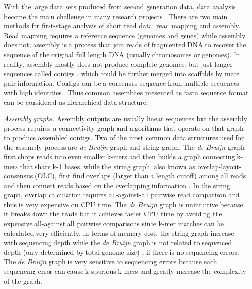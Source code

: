 \documentclass[]{msu-thesis}
\begin{document}
With the large data sets produced from second generation data, data analysis
become the main challenge in many research projects
\cite{qin_human_2010,pell_scaling_2012}. There are two main methods
for first-stage analysis of short read data: read mapping and assembly. Read mapping requires a
reference sequence (genomes and genes) while assembly does not; assembly
is a process that join reads of fragmented DNA to recover the sequence
of the original full length DNA (usually chromosomes or genomes). In
reality, assembly mostly does not produce complete genomes, but just
longer sequences called contigs
\cite{qin_human_2010,howe_tackling_2014}, which could be further
merged into scaffolds by mate pair information. Contigs can be a
consensus sequence from multiple sequences with high identities
\cite{zerbino_velvet:_2008}. Thus common assemblies presented as fasta
sequence format can be considered as hierarchical data structure.

\textit{Assembly graphs. } Assembly outputs are usually linear
sequences but the assembly process requires a connectivity graph and
algorithms that operate on that graph to produce assembled contigs. Two of the most common data structures used for the assembly
process are \textit{de Bruijn} graph and string graph.  The \textit{de
  Bruijn} graph first chops reads into even smaller k-mers and then
builds a graph connecting k-mers that share k-1 bases, while the string
graph, also known as overlap-layout-consensus (OLC), first find
overlaps (larger than a length cutoff) among all reads and then
connect reads based on the overlapping information
\cite{zerbino_velvet:_2008,simpson_efficient_2012}. In the string
graph, overlap calculation requires all-against-all pairwise read
comparison and thus is very expensive on CPU time. The \textit{de
  Bruijn} graph is unintuitive because it breaks down the reads but it
achieves faster CPU time by avoiding the expensive all-against all
pairwise comparisons since k-mer matches can be calculated very efficiently.
In terms of memory
cost, the string graph increase with sequencing depth while the
\textit{de Bruijn} graph is not related to sequenced depth (only
determined by total genome size) \cite{li_comparison_2012}, if there
is no sequencing errors. The \textit{de Bruijn} graph is very
sensitive to sequencing errors because each sequencing error can cause
k spurious k-mers and greatly increase the complexity of the graph.
\end{document}
